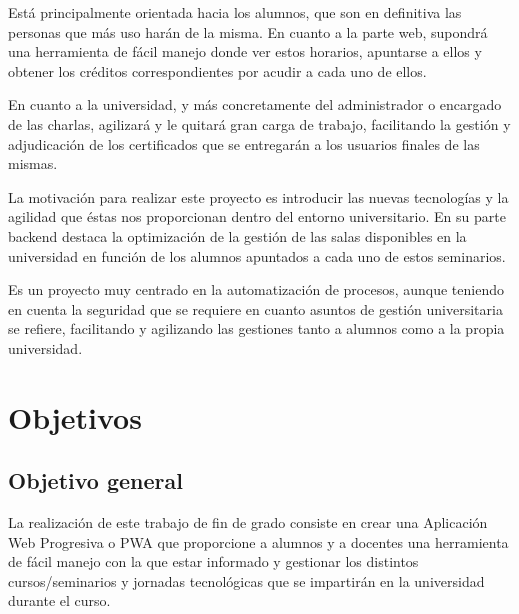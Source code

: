 \documentclass[a4paper, 12pt]{book}
\begin{document}
Está principalmente orientada hacia los alumnos, que son en definitiva las personas que más uso harán de la misma. En cuanto a la parte web, supondrá una herramienta de fácil manejo donde ver estos horarios, apuntarse a ellos y obtener los créditos correspondientes por acudir a cada uno de ellos.

En cuanto a la universidad, y más concretamente del administrador o encargado de las charlas, agilizará y le quitará gran carga de trabajo, facilitando la gestión y adjudicación de los certificados que se entregarán a los usuarios finales de las mismas.

La motivación para realizar este proyecto es introducir las nuevas tecnologías y la agilidad que éstas nos proporcionan dentro del entorno universitario. En su parte backend destaca la optimización de la gestión de las salas disponibles en la universidad en función de los alumnos apuntados a cada uno de estos seminarios.

Es un proyecto muy centrado en la automatización de procesos, aunque teniendo en cuenta la seguridad que se requiere en cuanto asuntos de gestión universitaria se refiere, facilitando y agilizando las gestiones tanto a alumnos como a la propia universidad.



\cleardoublepage %
\chapter{Objetivos} %
\label{chap:objetivos} %

\section{Objetivo general} %
\label{sec:objetivo-general} %

La realización de este trabajo de fin de grado consiste en crear una Aplicación Web Progresiva o PWA que proporcione a alumnos y a docentes una herramienta de fácil manejo con la que estar informado y gestionar los distintos cursos/seminarios y jornadas tecnológicas que se impartirán en la universidad durante el curso.
\end{document}
